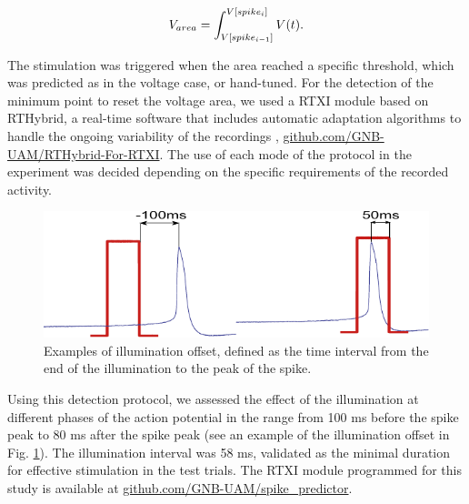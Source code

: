 \begin{equation}
	\centering 
	V_{area}=\int_{V[spike_{i-1}]}^{V[spike_{i}]}V(t).
	\label{eq:area}
\end{equation}

The stimulation was triggered when the area reached a specific threshold, which was predicted as in the voltage case, or hand-tuned. For the detection of the minimum point to reset the voltage area, we used a RTXI module based on RTHybrid, a real-time software that includes automatic adaptation algorithms to handle the ongoing variability of the recordings \parencite{amaducci_rthybrid_2019,reyes-sanchez_automatic_2020,reyes-sanchez_automatized_2023}, \href{https://github.com/GNB-UAM/rthybrid-for-rtxi/tree/master/rthybrid_burst_analysis}{github.com/GNB-UAM/RTHybrid-For-RTXI}. The use of each mode of the protocol in the experiment was decided depending on the specific requirements of the recorded activity. 

\begin{figure}[htb!]
	\includegraphics[width=\textwidth]{img/laser/offset_examples.pdf}
	\caption{Examples of illumination offset, defined as the time interval from the end of the illumination to the peak of the spike.}
	\label{fig:offset_example}
\end{figure}

Using this detection protocol, we assessed the effect of the illumination at different phases of the action potential in the range from 100 ms before the spike peak to 80 ms after the spike peak (see an example of the illumination offset in Fig. \ref{fig:offset_example}). The illumination interval was 58 ms, validated as the minimal duration for effective stimulation in the test trials. The RTXI module programmed for this study is available at \href{https://github.com/GNB-UAM/spike_predictor}{github.com/GNB-UAM/spike\_predictor}.


